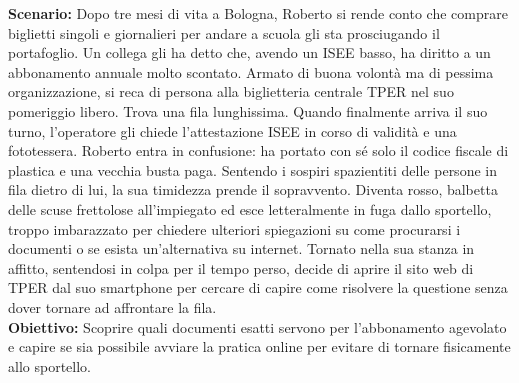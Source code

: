 \documentclass[11pt,a4paper]{article}
\begin{document}
\begin{tcolorbox}[colback=backgroundColor,colframe=borderColor,arc=2mm]
    {\small
    \textbf{Scenario:} Dopo tre mesi di vita a Bologna, Roberto si rende conto che comprare biglietti singoli e giornalieri per andare a scuola gli sta prosciugando il portafoglio. Un collega gli ha detto che, avendo un ISEE basso, ha diritto a un abbonamento annuale molto scontato. Armato di buona volontà ma di pessima organizzazione, si reca di persona alla biglietteria centrale TPER nel suo pomeriggio libero. Trova una fila lunghissima. Quando finalmente arriva il suo turno, l'operatore gli chiede l'attestazione ISEE in corso di validità e una fototessera. Roberto entra in confusione: ha portato con sé solo il codice fiscale di plastica e una vecchia busta paga. Sentendo i sospiri spazientiti delle persone in fila dietro di lui, la sua timidezza prende il sopravvento. Diventa rosso, balbetta delle scuse frettolose all'impiegato ed esce letteralmente in fuga dallo sportello, troppo imbarazzato per chiedere ulteriori spiegazioni su come procurarsi i documenti o se esista un'alternativa su internet. Tornato nella sua stanza in affitto, sentendosi in colpa per il tempo perso, decide di aprire il sito web di TPER dal suo smartphone per cercare di capire come risolvere la questione senza dover tornare ad affrontare la fila. \\[4pt]

    \textbf{Obiettivo:} Scoprire quali documenti esatti servono per l'abbonamento agevolato e capire se sia possibile avviare la pratica online per evitare di tornare fisicamente allo sportello. \\[4pt]

}
\end{tcolorbox}
\end{document}
